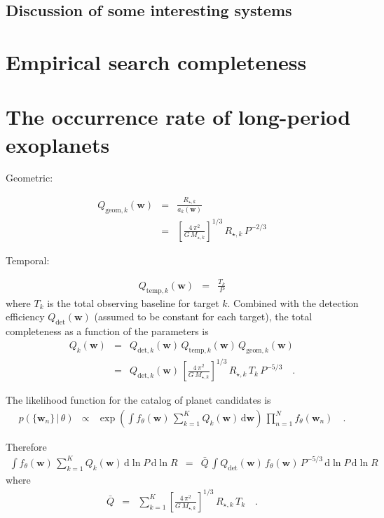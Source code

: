\documentclass[twocolumn]{aastex6}
\newcommand{\dd}{\ensuremath{\,\mathrm{d}}}
\newcommand{\bvec}[1]{{\ensuremath{\boldsymbol{#1}}}}
\newcommand{\params}{{\ensuremath{\bvec{w}}}}
\newcommand{\poppars}{{\ensuremath{\theta}}}
\begin{document}
\subsection{Discussion of some interesting systems}



\section{Empirical search completeness}


\section{The occurrence rate of long-period exoplanets}

Geometric:

\begin{eqnarray}
Q_{\mathrm{geom},k} (\params) &=& \frac{R_{\star,k}}{a_k(\params)} \\
&=& \left[\frac{4\,\pi^2}{G\,M_{\star,k}}\right]^{1/3}\,R_{\star,k}\,P^{-2/3}
\end{eqnarray}

Temporal:

\begin{eqnarray}
Q_{\mathrm{temp},k} (\params) &=& \frac{T_k}{P}
\end{eqnarray}
where $T_k$ is the total observing baseline for target $k$.
Combined with the detection efficiency $Q_{\mathrm{det}}(\params)$ (assumed to
be constant for each target), the total completeness as a function of the
parameters is
\begin{eqnarray}
Q_k(\params) &=& Q_{\mathrm{det},k}(\params) \,
                 Q_{\mathrm{temp},k} (\params) \,
                 Q_{\mathrm{geom},k} (\params) \\
&=& Q_{\mathrm{det},k}(\params) \,
    \left[\frac{4\,\pi^2}{G\,M_{\star,k}}\right]^{1/3}\,
    R_{\star,k}\,T_k\,P^{-5/3} \quad.
\end{eqnarray}

The likelihood function for the catalog of planet candidates is
\begin{eqnarray}
p(\{\params_n\}\,|\,\poppars) &\propto&
    \exp \left(
        \int f_\poppars (\params)\,\sum_{k=1}^K Q_k(\params) \dd\params
    \right) \, \prod_{n=1}^N f_\poppars (\params_n) \quad.
\end{eqnarray}

Therefore
\begin{eqnarray}
\int f_\poppars (\params)\,\sum_{k=1}^K Q_k(\params) \dd\ln P\dd\ln R &=&
    \bar{Q}\,\int Q_{\mathrm{det}}(\params)\,f_\poppars(\params)\,P^{-5/3}
        \dd\ln P\dd\ln R
\end{eqnarray}
where
\begin{eqnarray}
\bar{Q} &=& \sum_{k=1}^K
    \left[\frac{4\,\pi^2}{G\,M_{\star,k}}\right]^{1/3}\,R_{\star,k}\,T_k
\quad.
\end{eqnarray}
\end{document}
